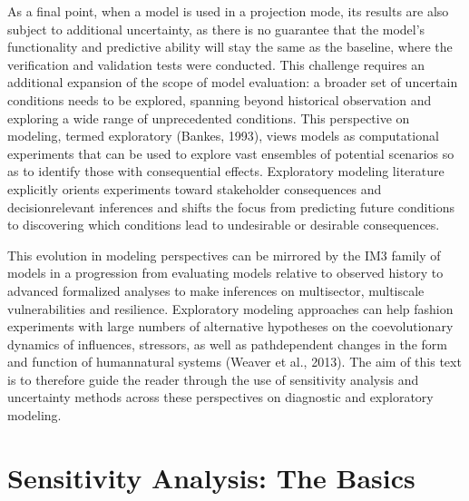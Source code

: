\documentclass[letterpaper,10pt,english]{sphinxmanual}
\begin{document}
\sphinxAtStartPar
As a final point, when a model is used in a projection mode, its results are also subject to additional uncertainty, as there is no guarantee that the model’s functionality and predictive ability will stay the same as the baseline, where the verification and validation tests were conducted. This challenge requires an additional expansion of the scope of model evaluation: a broader set of uncertain conditions needs to be explored, spanning beyond historical observation and exploring a wide range of unprecedented conditions. This perspective on modeling, termed exploratory (Bankes, 1993), views models as computational experiments that can be used to explore vast ensembles of potential scenarios so as to identify those with consequential effects. Exploratory modeling literature explicitly orients experiments toward stakeholder consequences and decision\sphinxhyphen{}relevant inferences and shifts the focus from predicting future conditions to discovering which conditions lead to undesirable or desirable consequences.

\sphinxAtStartPar
This evolution in modeling perspectives can be mirrored by the IM3 family of models in a progression from evaluating models relative to observed history to advanced formalized analyses to make inferences on multisector, multiscale vulnerabilities and resilience. Exploratory modeling approaches can help fashion experiments with large numbers of alternative hypotheses on the co\sphinxhyphen{}evolutionary dynamics of influences, stressors, as well as path\sphinxhyphen{}dependent changes in the form and function of human\sphinxhyphen{}natural systems (Weaver et al., 2013). The aim of this text is to therefore guide the reader through the use of sensitivity analysis and uncertainty methods across these perspectives on diagnostic and exploratory modeling.


\chapter{Sensitivity Analysis: The Basics}
\label{\detokenize{3_sensitivity_analysis_the_basics:sensitivity-analysis-the-basics}}\label{\detokenize{3_sensitivity_analysis_the_basics::doc}}
\end{document}

